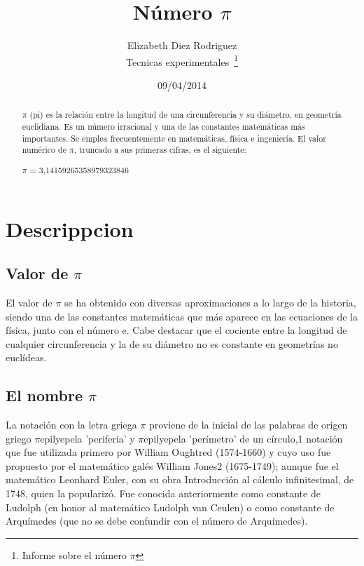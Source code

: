 \documentclass[a4paper,12pt]{article}
\begin{document}
\title{Número $\pi$}
\author{Elizabeth Diez Rodriguez\\
        Tecnicas experimentales~\footnote{Informe sobre el  número $\pi$} 
        }
\date{09/04/2014}
\maketitle



\begin{abstract}
$\pi$ (pi) es la relación entre la longitud de una circunferencia y su diámetro, en geometría euclidiana.
Es un número irracional y una de las constantes matemáticas más importantes. Se emplea frecuentemente en matemáticas, 
física e ingeniería. El valor numérico de $\pi$, truncado a sus primeras cifras, es el siguiente:

    $\pi$ = 3,14159265358979323846  
\end{abstract}


\section{Descrippcion}

\subsection{Valor de $\pi$}
El valor de $\pi$ se ha obtenido con diversas aproximaciones a lo largo de la historia,
siendo una de las constantes matemáticas que más aparece en las ecuaciones de la física, junto con el número e.
Cabe destacar que el cociente entre la longitud de cualquier circunferencia y 
la de su diámetro no es constante en geometrías no euclídeas.

 \cite{pi2}
 
\subsection{El nombre $\pi$}
La notación con la letra griega $\pi$ proviene de la inicial de las palabras de origen griego $\pi$epilyepela 'periferia'
y $\pi$epilyepela 'perímetro' de un círculo,1 notación que fue utilizada primero por William Oughtred (1574-1660) y 
cuyo uso fue propuesto por el matemático galés William Jones2 (1675-1749); aunque fue el matemático Leonhard Euler,
con su obra Introducción al cálculo infinitesimal, de 1748, quien la popularizó. Fue conocida anteriormente como constante
de Ludolph (en honor al matemático Ludolph van Ceulen) o como constante de Arquímedes (que no se debe confundir con el número
de Arquímedes).
\end{document}
